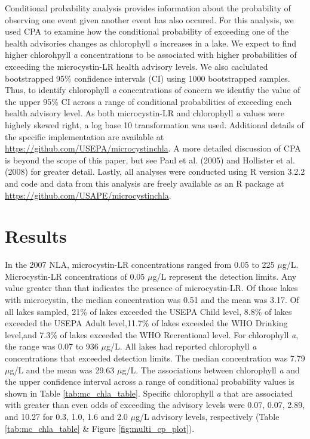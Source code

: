 \documentclass[11pt,]{article}
\begin{document}
Conditional probability analysis provides information about the
probability of observing one event given another event has also occured.
For this analysis, we used CPA to examine how the conditional
probability of exceeding one of the health advisories changes as
chlorophyll \emph{a} increases in a lake. We expect to find higher
chlorohpyll \emph{a} concentrations to be associated with higher
probabilities of exceeding the microcystin-LR health advisory levels. We
also caclulated bootstrapped 95\% confidence intervals (CI) using 1000
bootstrapped samples. Thus, to identify chlorophyll \emph{a}
concentrations of concern we identfiy the value of the upper 95\% CI
across a range of conditional probabilities of exceeding each health
advisory level. As both microcystin-LR and chlorophyll \emph{a} values
were highely skewed right, a log base 10 transformation was used.
Additional details of the specific implementation are available at
\url{https://github.com/USEPA/microcystinchla}. A more detailed
discussion of CPA is beyond the scope of this paper, but see Paul et al.
(2005) and Hollister et al. (2008) for greater detail. Lastly, all
analyses were conducted using R version 3.2.2 and code and data from
this analysis are freely available as an R package at
\href{https://github.com/USAPE/microcystinchla}{\url{https://github.com/USAPE/microcystinchla}}.

\section{Results}\label{results}

In the 2007 NLA, microcystin-LR concentrations ranged from 0.05 to 225
\(\mu\)g/L. Microcystin-LR concentrations of 0.05 \(\mu\)g/L represent
the detection limits. Any value greater than that indicates the presence
of microcystin-LR. Of those lakes with microcystin, the median
concentration was 0.51 and the mean was 3.17. Of all lakes sampled, 21\%
of lakes exceeded the USEPA Child level, 8.8\% of lakes exceeded the
USEPA Adult level,11.7\% of lakes exceeded the WHO Drinking level,and
7.3\% of lakes exceeded the WHO Recreational level. For chlorophyll
\emph{a}, the range was 0.07 to 936 \(\mu\)g/L. All lakes had reported
chlorophyll \emph{a} concentrations that exceeded detection limits. The
median concentration was 7.79 \(\mu\)g/L and the mean was 29.63
\(\mu\)g/L. The associations between chlorophyll \emph{a} and the upper
confidence interval across a range of conditional probability values is
shown in Table \ref{tab:mc_chla_table}. Specific chlorophyll \emph{a}
that are associated with greater than even odds of exceeding the
advisory levels were 0.07, 0.07, 2.89, and 10.27 for 0.3, 1.0, 1.6 and
2.0 \(\mu\)g/L advisory levels, respectively (Table
\ref{tab:mc_chla_table} \& Figure \ref{fig:multi_cp_plot}).
\end{document}
